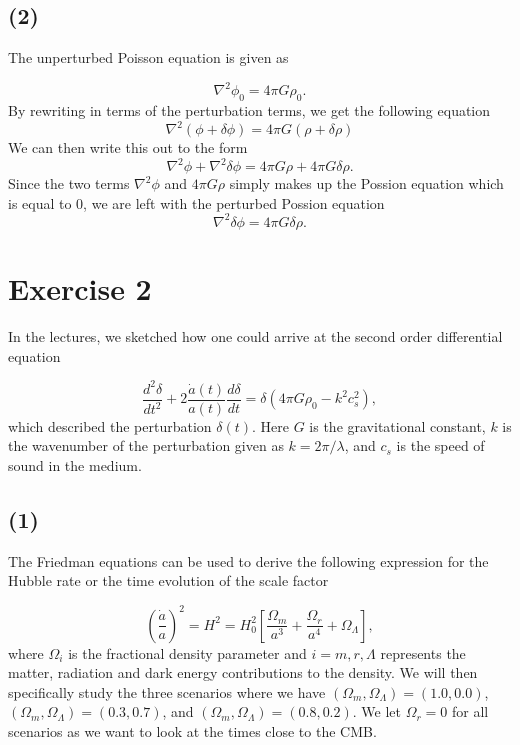 \documentclass[a4paper,11.5pt,]{article}
\begin{document}
\subsection*{(2)}

The unperturbed Poisson equation is given as

\begin{equation}\label{eq:4}
\nabla^2 \phi_0 = 4 \pi G \rho_0.
\end{equation}
By rewriting in terms of the perturbation terms, we get the following equation
\[
\nabla^2 (\phi + \delta \phi) = 4\pi G (\rho + \delta \rho)
\]
We can then write this out to the form
\[
\nabla^2 \phi + \nabla^2 \delta \phi = 4 \pi G \rho +4 \pi G \delta \rho.
\]
Since the two terms $\nabla^2 \phi$ and $4 \pi G \rho$ simply makes up the Possion equation which is equal to 0, we are left with the perturbed Possion equation
\begin{equation}\label{eq:4}
\nabla^2 \delta \phi = 4 \pi G \delta \rho.
\end{equation}


\section*{Exercise 2}
In the lectures, we sketched how one could arrive at the second order differential equation 

\begin{equation}\label{eq:6}
\frac{d^2 \delta}{dt^2} + 2 \frac{\dot{a}(t)}{a(t)} \frac{d \delta}{dt} = \delta(4 \pi G \rho_0 - k^2 c_s^2),
\end{equation}
which described the perturbation $\delta(t)$. Here $G$ is the gravitational constant, $k$ is the wavenumber of the perturbation given as $k = 2\pi/ \lambda$, and $c_s$ is the speed of sound in the medium.
\subsection*{(1)}

The Friedman equations can be used to derive the following expression for the Hubble rate or the time evolution of the scale factor 

\begin{equation}\label{eq:7}
\left(\frac{\dot{a}}{a}\right)^2 = H^2 = H_0^2 \left[ \frac{\Omega_m}{a^3} + \frac{\Omega_r}{a^4} + \Omega_\Lambda \right],
\end{equation}
where $\Omega_i$ is the fractional density parameter and
$i = m,r, \Lambda$ represents the matter, radiation and dark energy contributions to the density. We will then specifically study the three scenarios where we have  $(\Omega_m, \Omega_\Lambda) = (1.0, 0.0)$, $(\Omega_m, \Omega_\Lambda) = (0.3, 0.7)$, and $(\Omega_m, \Omega_\Lambda) = (0.8, 0.2)$. We let $\Omega_r = 0$ for all scenarios as we want to look at the times close to the CMB.
\end{document}
